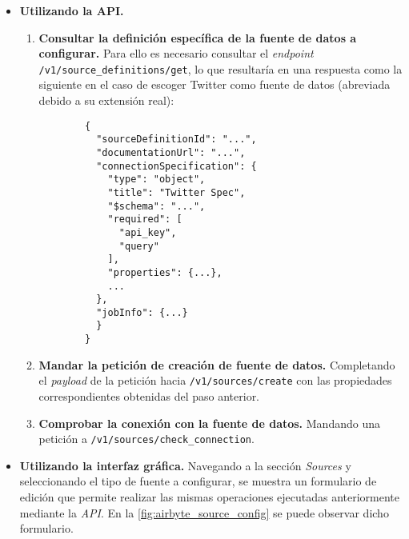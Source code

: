 \begin{itemize}
    
    \item \textbf{Utilizando la API.}
    
    \begin{enumerate}
        
        \item \textbf{Consultar la definición específica de la fuente de datos a configurar.} Para ello es necesario consultar el \textit{endpoint} \verb|/v1/source_definitions/get|, lo que resultaría en una respuesta como la siguiente en el caso de escoger Twitter como fuente de datos (abreviada debido a su extensión real):

        \begin{verbatim}
        {
          "sourceDefinitionId": "...",
          "documentationUrl": "...",
          "connectionSpecification": {
            "type": "object",
            "title": "Twitter Spec",
            "$schema": "...",
            "required": [
              "api_key",
              "query"
            ],
            "properties": {...},
            ...
          },
          "jobInfo": {...}
          }
        }
        \end{verbatim}
        
        \item \textbf{Mandar la petición de creación de fuente de datos.} Completando el \textit{payload} de la petición hacia \verb|/v1/sources/create| con las propiedades correspondientes obtenidas del paso anterior. 
        
        \item \textbf{Comprobar la conexión con la fuente de datos.} Mandando una petición a \verb|/v1/sources/check_connection|.
    
    \end{enumerate}
    
    \item \textbf{Utilizando la interfaz gráfica.} Navegando a la sección \textit{Sources} y seleccionando el tipo de fuente a configurar, se muestra un formulario de edición que permite realizar las mismas operaciones ejecutadas anteriormente mediante la \textit{API}. En la \autoref{fig:airbyte_source_config} se puede observar dicho formulario.

    
\end{itemize}

